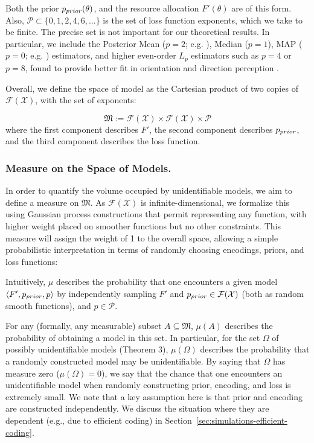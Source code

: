 Both the prior $p_{prior}(\theta)$, and the resource allocation $F'(\theta)$ are of this form. 
Also, $\mathcal{P} \subset \{0, 1, 2, 4, 6, \dots\}$ is the set of loss function exponents, which we take to be finite.
The precise set is not important for our theoretical results.
In particular, we include the Posterior Mean ($p=2$; e.g. \citep{Jazayeri2010TemporalCC}), Median ($p=1$), MAP ($p=0$; e.g. \citep{Stocker2006NoiseCA}) estimators, and higher even-order $L_p$ estimators such as $p=4$ or $p=8$, found to provide better fit in orientation and direction perception \citep{hahn2024unifying}.



Overall, we define the space of model as the Cartesian product of two copies of $\mathcal{F}(\mathcal{X})$, with the set of exponents:
\begin{defin}
\begin{equation}
    \mathfrak{M} := \mathcal{F}(\mathcal{X}) \times \mathcal{F}(\mathcal{X}) \times \mathcal{P}
\end{equation}
where the first component describes $F'$, the second component describes $p_{prior}$, and the third component describes the loss function.
\end{defin}


\subsubsection{Measure on the Space of Models.}\label{sec:measure-mu}
In order to quantify the volume occupied by unidentifiable models, we aim to define a measure on $\mathfrak{M}$. As $\mathcal{F}(\mathcal{X})$ is infinite-dimensional, we formalize this using Gaussian process constructions that permit representing any function, with higher weight placed on smoother functions but no other constraints.
This measure will assign the weight of 1 to the overall space, allowing a simple probabilistic interpretation in terms of randomly choosing encodings, priors, and loss functions:
\begin{informal_assumption}\label{ass:informal}
Intuitively, $\mu$ describes the probability that one encounters a given model $\langle F', p_{prior}, p\rangle$ by independently sampling $F'$ and $p_{prior} \in \mathcal{F}(\mathcal{X})$ (both as random smooth functions), and $p \in \mathcal{P}$.
\end{informal_assumption}
For any (formally, any measurable) subset $A \subseteq \mathfrak{M}$, $\mu(A)$ describes the probability of obtaining a model in this set. In particular, for the set $\Omega$ of possibly unidentifiable models (Theorem 3), $\mu(\Omega)$ describes the probability that a randomly constructed model may be unidentifiable.
By saying that $\Omega$ has measure zero ($\mu(\Omega) = 0$), we say that the chance that one encounters an unidentifiable model when randomly constructing prior, encoding, and loss is extremely small.
We note that a key assumption here is that prior and encoding are constructed independently.
We discuss the situation where they are dependent (e.g., due to efficient coding) in Section~\ref{sec:simulations-efficient-coding}.


